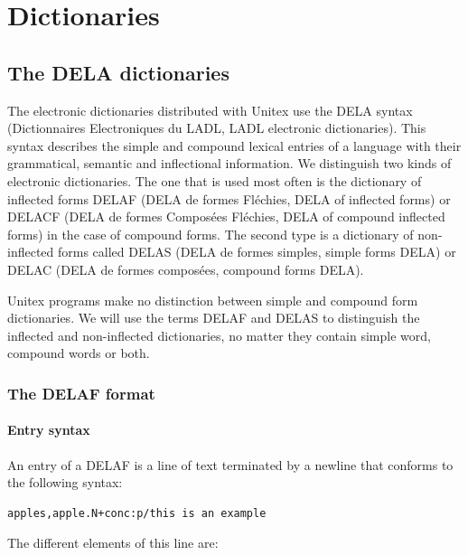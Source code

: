 \chapter{Dictionaries}
\label{chap-dictionaries}

\section{The DELA dictionaries}

The electronic dictionaries distributed with Unitex use the DELA syntax
(Dictionnaires Electroniques du LADL, LADL electronic dictionaries). This syntax
describes the simple and compound lexical entries  of a
language with their grammatical, semantic and inflectional information. We
distinguish two kinds of electronic dictionaries. The one that is used most often
is the  dictionary of inflected forms DELAF (DELA de formes Fl\'echies, DELA of
inflected forms) or DELACF (DELA de formes Compos\'ees Fl\'echies, DELA of
compound inflected forms) in the case of compound forms.
The second type is a dictionary of non-inflected forms called DELAS (DELA de
formes simples, simple forms DELA) or DELAC (DELA de formes compos\'ees,
compound forms DELA).

\bigskip
\noindent Unitex programs make no  distinction between simple and compound form
dictionaries. We will use the terms DELAF and DELAS to distinguish the
inflected and non-inflected dictionaries, no matter they contain simple word,
compound words or both. 

\subsection{The DELAF format}
\label{section-DELAF-format}
\subsubsection{Entry syntax}
An entry of a DELAF is a line of text terminated by a newline that conforms to
the following syntax:

\bigskip
\begin{verbatim}
apples,apple.N+conc:p/this is an example
\end{verbatim}

\bigskip
\noindent The different elements of this line are:

